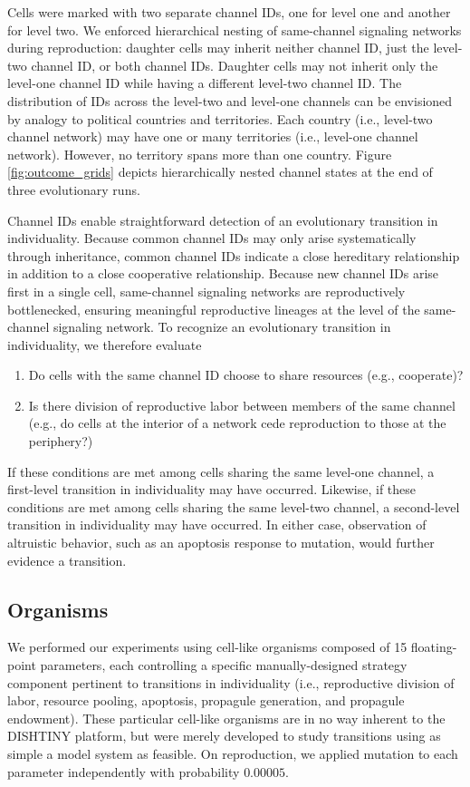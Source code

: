 Cells were marked with two separate channel IDs, one for level one and another for level two.
We enforced hierarchical nesting of same-channel signaling networks during reproduction:
daughter cells may inherit neither channel ID, just the level-two channel ID, or both channel IDs.
Daughter cells may not inherit only the level-one channel ID while having a different level-two channel ID.
The distribution of IDs across the level-two and level-one channels can be envisioned by analogy to political countries and territories.
Each country (i.e., level-two channel network) may have one or many territories (i.e., level-one channel network).
However, no territory spans more than one country.
Figure \ref{fig:outcome_grids} depicts hierarchically nested channel states at the end of three evolutionary runs.

Channel IDs enable straightforward detection of an evolutionary transition in individuality.
Because common channel IDs may only arise systematically through inheritance, common channel IDs indicate a close hereditary relationship in addition to a close cooperative relationship.
Because new channel IDs arise first in a single cell, same-channel signaling networks are reproductively bottlenecked, ensuring meaningful reproductive lineages at the level of the same-channel signaling network.
To recognize an evolutionary transition in individuality, we therefore evaluate
\begin{enumerate}
\item Do cells with the same channel ID choose to share resources (e.g., cooperate)?
\item Is there division of reproductive labor between members of the same channel (e.g., do cells at the interior of a network cede reproduction to those at the periphery?)
\end{enumerate}
If these conditions are met among cells sharing the same level-one channel, a first-level transition in individuality may have occurred.
Likewise, if these conditions are met among cells sharing the same level-two channel, a second-level transition in individuality may have occurred.
In either case, observation of altruistic behavior, such as an apoptosis response to mutation, would further evidence a transition.

\subsection{Organisms}

We performed our experiments using cell-like organisms composed of 15 floating-point parameters, each controlling a specific manually-designed strategy component pertinent to transitions in individuality (i.e., reproductive division of labor, resource pooling, apoptosis, propagule generation, and propagule endowment).
These particular cell-like organisms are in no way inherent to the DISHTINY platform, but were merely developed to study transitions using as simple a model system as feasible.
On reproduction, we applied mutation to each parameter independently with probability $0.00005$.

